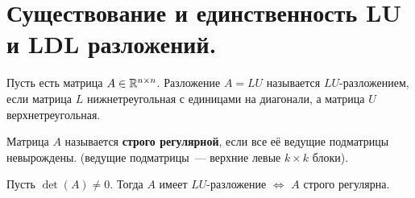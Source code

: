 \section{Существование и единственность LU и LDL разложений.}
\begin{definition*}
    Пусть есть матрица $A \in \mathbb{R}^{n\times n}$. Разложение $A = LU$ называется $LU$-разложением, если матрица $L$ нижнетреугольная с единицами на диагонали, а матрица $U$ верхнетреугольная.
\end{definition*}
\begin{definition*}
    Матрица $A$ называется \textbf{строго регулярной}, если все её ведущие подматрицы невырождены. (ведущие подматрицы~--- верхние левые $k\times k$ блоки).
\end{definition*}
\begin{theorem*}
    Пусть $\det(A) \neq 0$. Тогда $A$ имеет $LU$-разложение $\iff$ $A$ строго регулярна.
\end{theorem*}
